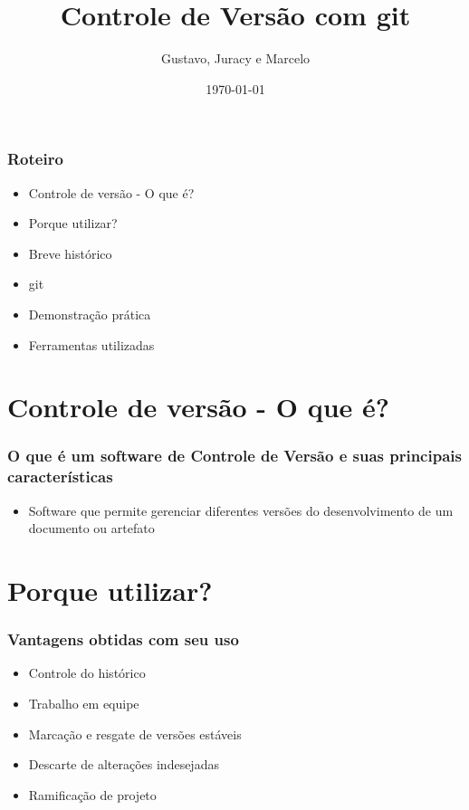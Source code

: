 \documentclass{beamer}
\title[Gerência de Configuração e Testes]{Controle de Versão com git}
\author[Grupo Masters]{Gustavo, Juracy e Marcelo}
\institute{Centro Universitário Jorge Amado}
\date{\today}
\begin{document}
  \frame{\titlepage}
    \begin{frame}
    \frametitle{Roteiro}
   	\begin{itemize}
      \item Controle de versão - O que é?
      \item Porque utilizar?
      \item Breve histórico
      \item git
      \item Demonstração prática
      \item Ferramentas utilizadas
    \end{itemize}
  \end{frame}

  \section{Controle de versão - O que é?}
  \begin{frame}
    \frametitle{O que é um software de Controle de Versão e suas principais características}
    \begin{itemize}
      \item Software que permite gerenciar diferentes versões do desenvolvimento de um documento ou artefato
    \end{itemize}
    \vfill
  \end{frame}

  \section{Porque utilizar?}
  \begin{frame}
    \frametitle{Vantagens obtidas com seu uso}
    \begin{itemize}
      \item Controle do histórico
      \item Trabalho em equipe
      \item Marcação e resgate de versões estáveis
      \item Descarte de alterações indesejadas
      \item Ramificação de projeto
    \end{itemize}
    \vfill
  \end{frame}
\end{document}
